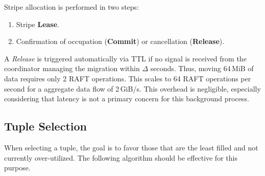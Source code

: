 \documentclass[a4paper,12pt]{article}
\begin{document}
\begin{center}
    \end{center}

    Stripe allocation is performed in two steps:

    \begin{enumerate}
        \item Stripe \textbf{Lease}.
        \item Confirmation of occupation (\textbf{Commit}) or cancellation (\textbf{Release}).
    \end{enumerate}

    A \textit{Release} is triggered automatically via TTL if no signal is received from the coordinator managing the migration within $\Delta$ seconds. Thus, moving 64\,MiB of data requires only 2 RAFT operations. This scales to 64 RAFT operations per second for a aggregate data flow of 2\,GiB/s. This overhead is negligible, especially considering that latency is not a primary concern for this background process.

    \subsection{Tuple Selection}

    When selecting a tuple, the goal is to favor those that are the least filled and not currently over-utilized. The following algorithm should be effective for this purpose.
\end{document}
